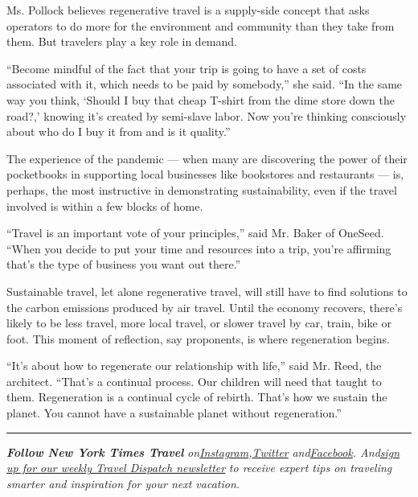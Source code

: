 Ms. Pollock believes regenerative travel is a supply-side concept that
asks operators to do more for the environment and community than they
take from them. But travelers play a key role in demand.

``Become mindful of the fact that your trip is going to have a set of
costs associated with it, which needs to be paid by somebody,'' she
said. ``In the same way you think, `Should I buy that cheap T-shirt from
the dime store down the road?,' knowing it's created by semi-slave
labor. Now you're thinking consciously about who do I buy it from and is
it quality.''

The experience of the pandemic --- when many are discovering the power
of their pocketbooks in supporting local businesses like bookstores and
restaurants --- is, perhaps, the most instructive in demonstrating
sustainability, even if the travel involved is within a few blocks of
home.

``Travel is an important vote of your principles,'' said Mr. Baker of
OneSeed. ``When you decide to put your time and resources into a trip,
you're affirming that's the type of business you want out there.''

Sustainable travel, let alone regenerative travel, will still have to
find solutions to the carbon emissions produced by air travel. Until the
economy recovers, there's likely to be less travel, more local travel,
or slower travel by car, train, bike or foot. This moment of reflection,
say proponents, is where regeneration begins.

``It's about how to regenerate our relationship with life,'' said Mr.
Reed, the architect. ``That's a continual process. Our children will
need that taught to them. Regeneration is a continual cycle of rebirth.
That's how we sustain the planet. You cannot have a sustainable planet
without regeneration.''

\begin{center}\rule{0.5\linewidth}{\linethickness}\end{center}

\emph{\textbf{Follow New York Times Travel}}
\emph{on}\href{https://www.instagram.com/nytimestravel/}{\emph{Instagram}}\emph{,}\href{https://twitter.com/nytimestravel}{\emph{Twitter}}
\emph{and}\href{https://www.facebookcorewwwi.onion/nytimestravel/}{\emph{Facebook}}\emph{.
And}\href{https://www.nytimes3xbfgragh.onion/newsletters/traveldispatch}{\emph{sign
up for our weekly Travel Dispatch newsletter}} \emph{to receive expert
tips on traveling smarter and inspiration for your next vacation.}

